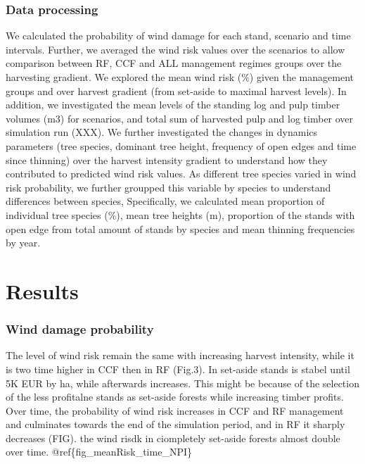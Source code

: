 \documentclass[]{elsarticle} %
\begin{document}
\hypertarget{data-processing}{%
\subsubsection{Data processing}\label{data-processing}}

We calculated the probability of wind damage for each stand, scenario
and time intervals. Further, we averaged the wind risk values over the
scenarios to allow comparison between RF, CCF and ALL management regimes
groups over the harvesting gradient. We explored the mean wind risk (\%)
given the management groups and over harvest gradient (from set-aside to
maximal harvest levels). In addition, we investigated the mean levels of
the standing log and pulp timber volumes (m3) for scenarios, and total
sum of harvested pulp and log timber over simulation run (XXX). We
further investigated the changes in dynamics parameters (tree species,
dominant tree height, frequency of open edges and time since thinning)
over the harvest intensity gradient to understand how they contributed
to predicted wind risk values. As different tree species varied in wind
risk probability, we further groupped this variable by species to
understand differences between species, Specifically, we calculated mean
proportion of individual tree species (\%), mean tree heights (m),
proportion of the stands with open edge from total amount of stands by
species and mean thinning frequencies by year.

\hypertarget{results}{%
\section{Results}\label{results}}

\hypertarget{wind-damage-probability}{%
\subsubsection{Wind damage probability}\label{wind-damage-probability}}

The level of wind risk remain the same with increasing harvest
intensity, while it is two time higher in CCF then in RF (Fig.3). In
set-aside stands is stabel until 5K EUR by ha, while afterwards
increases. This might be because of the selection of the less profitalne
stands as set-aside forests while increasing timber profits. Over time,
the probability of wind risk increases in CCF and RF management and
culminates towards the end of the simulation period, and in RF it
sharply decreases (FIG). the wind risdk in ciompletely set-aside forests
almost double over time. @ref\{fig\_meanRisk\_time\_NPI\}
\end{document}
